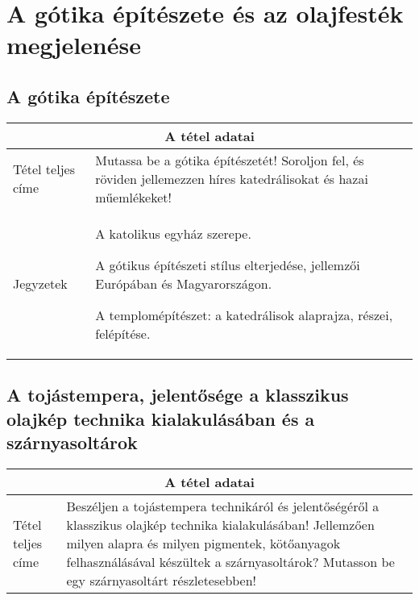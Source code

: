 \chapter{A gótika építészete és az olajfesték megjelenése} %
\label{ch:6_gotika_epetiszet}

\section{A gótika építészete}

\begin{center}
	\begin{longtable}{ | p{} | p{} | }
		
		\hline
		\multicolumn{2}{|c|}{\textbf{A tétel adatai}}
		\\ \hline
		
		\hline
		Tétel teljes címe
		&
		Mutassa be a gótika építészetét! Soroljon fel, és röviden jellemezzen híres katedrálisokat és hazai műemlékeket!
		\\ \hline
		
		Jegyzetek
		&
		\begin{compactitem}
			\item A katolikus egyház szerepe.
			\item A gótikus építészeti stílus elterjedése, jellemzői Európában és Magyarországon.
			\item A templomépítészet: a katedrálisok alaprajza, részei, felépítése.
		\end{compactitem}
		\\\hline
		
	\end{longtable}
\end{center}

\cleardoublepage


\section{A tojástempera, jelentősége a klasszikus olajkép technika kialakulásában és a szárnyasoltárok}

\begin{center}
	\begin{longtable}{ | p{} | p{} | }
		
		\hline
		\multicolumn{2}{|c|}{\textbf{A tétel adatai}}
		\\ \hline
		
		\hline
		Tétel teljes címe 
		&
		Beszéljen a tojástempera technikáról és jelentőségéről a klasszikus olajkép technika kialakulásában! Jellemzően milyen alapra és milyen pigmentek, kötőanyagok felhasználásával készültek a szárnyasoltárok? Mutasson be egy szárnyasoltárt részletesebben!
		\\ \hline
		
	\end{longtable}
\end{center}
